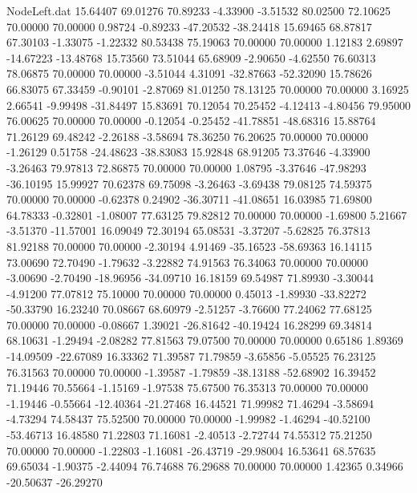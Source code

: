 \begin{filecontents}{NodeLeft.dat}
  15.64407   69.01276   70.89233    -4.33900   -3.51532   80.02500   72.10625   70.00000   70.00000    0.98724   -0.89233  -47.20532  -38.24418
  15.69465   68.87817   67.30103    -1.33075   -1.22332   80.53438   75.19063   70.00000   70.00000    1.12183    2.69897  -14.67223  -13.48768
  15.73560   73.51044   65.68909    -2.90650   -4.62550   76.60313   78.06875   70.00000   70.00000   -3.51044    4.31091  -32.87663  -52.32090
  15.78626   66.83075   67.33459    -0.90101   -2.87069   81.01250   78.13125   70.00000   70.00000    3.16925    2.66541   -9.99498  -31.84497
  15.83691   70.12054   70.25452    -4.12413   -4.80456   79.95000   76.00625   70.00000   70.00000   -0.12054   -0.25452  -41.78851  -48.68316
  15.88764   71.26129   69.48242    -2.26188   -3.58694   78.36250   76.20625   70.00000   70.00000   -1.26129    0.51758  -24.48623  -38.83083
  15.92848   68.91205   73.37646    -4.33900   -3.26463   79.97813   72.86875   70.00000   70.00000    1.08795   -3.37646  -47.98293  -36.10195
  15.99927   70.62378   69.75098    -3.26463   -3.69438   79.08125   74.59375   70.00000   70.00000   -0.62378    0.24902  -36.30711  -41.08651
  16.03985   71.69800   64.78333    -0.32801   -1.08007   77.63125   79.82812   70.00000   70.00000   -1.69800    5.21667   -3.51370  -11.57001
  16.09049   72.30194   65.08531    -3.37207   -5.62825   76.37813   81.92188   70.00000   70.00000   -2.30194    4.91469  -35.16523  -58.69363
  16.14115   73.00690   72.70490    -1.79632   -3.22882   74.91563   76.34063   70.00000   70.00000   -3.00690   -2.70490  -18.96956  -34.09710
  16.18159   69.54987   71.89930    -3.30044   -4.91200   77.07812   75.10000   70.00000   70.00000    0.45013   -1.89930  -33.82272  -50.33790
  16.23240   70.08667   68.60979    -2.51257   -3.76600   77.24062   77.68125   70.00000   70.00000   -0.08667    1.39021  -26.81642  -40.19424
  16.28299   69.34814   68.10631    -1.29494   -2.08282   77.81563   79.07500   70.00000   70.00000    0.65186    1.89369  -14.09509  -22.67089
  16.33362   71.39587   71.79859    -3.65856   -5.05525   76.23125   76.31563   70.00000   70.00000   -1.39587   -1.79859  -38.13188  -52.68902
  16.39452   71.19446   70.55664    -1.15169   -1.97538   75.67500   76.35313   70.00000   70.00000   -1.19446   -0.55664  -12.40364  -21.27468
  16.44521   71.99982   71.46294    -3.58694   -4.73294   74.58437   75.52500   70.00000   70.00000   -1.99982   -1.46294  -40.52100  -53.46713
  16.48580   71.22803   71.16081    -2.40513   -2.72744   74.55312   75.21250   70.00000   70.00000   -1.22803   -1.16081  -26.43719  -29.98004
  16.53641   68.57635   69.65034    -1.90375   -2.44094   76.74688   76.29688   70.00000   70.00000    1.42365    0.34966  -20.50637  -26.29270

\end{filecontents}
